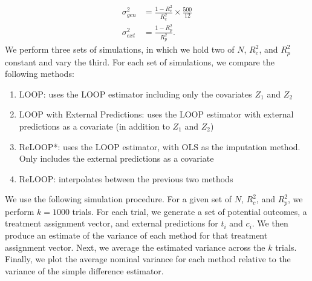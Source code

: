 \begin{align*}
\sigma^2_{gen} &= \frac{1-R_c^2}{R_c^2}\times\frac{500}{12} \\
\sigma^2_{ext} &= \frac{1 - R^2_{p}}{R_p^2} .
\end{align*}
We perform three sets of simulations, in which we hold two of $N$, $R_c^2$, and $R^2_{p}$ constant and vary the third.  For each set of simulations, we compare the following methods:
\begin{enumerate}
	\item LOOP: uses the LOOP estimator including only the covariates $Z_1$ and $Z_2$
	\item LOOP with External Predictions: uses the LOOP estimator with external predictions as a covariate (in addition to $Z_1$ and $Z_2$)
	\item ReLOOP*: uses the LOOP estimator, with OLS as the imputation method. Only includes the external predictions as a covariate
	\item ReLOOP: interpolates between the previous two methods
\end{enumerate}
\noindent
We use the following simulation procedure. For a given set of $N$, $R_c^2$, and $R^2_{p}$, we perform $k = 1000$ trials. For each trial, we generate a set of potential outcomes, a treatment assignment vector, and external predictions for $t_i$ and $c_i$. We then produce an estimate of the variance of each method for that treatment assignment vector. Next, we average the estimated variance across the $k$ trials. Finally, we plot the average nominal variance for each method relative to the variance of the simple difference estimator.

